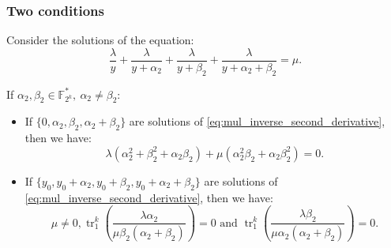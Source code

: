 \documentclass[
    aspectratio=169,                   %
]{beamer}
\newcommand{\Fks}{\mathbb{F}_{2^k}^*}
\newcommand{\tr}{\operatorname{tr}_1^k}
\begin{document}
    \begin{frame}
        \frametitle{Two conditions}
        Consider the solutions of the equation: 
        \begin{equation}\tag{5}
            \frac{\lambda}{y}+\frac{\lambda}{y+\alpha_2}+\frac{\lambda}{y+\beta_2}+\frac{\lambda}{y+\alpha_2+\beta_2}=\mu.
        \end{equation}

        If $ \alpha_2,\beta_2\in\Fks,~\alpha_2\ne\beta_2 $: 
        \begin{itemize}
            \item If $ \{0,\alpha_2,\beta_2,\alpha_2+\beta_2\} $ are solutions of \eqref{eq:mul_inverse_second_derivative}, 
            then we have: 
            \begin{equation}\label{condition:0_root_condition_1}\tag{c-1}
                \lambda(\alpha_2^2+\beta_2^2+\alpha_2\beta_2)+\mu(\alpha_2^2\beta_2+\alpha_2\beta_2^2)=0.
            \end{equation}
            \item If $ \{y_0,y_0+\alpha_2,y_0+\beta_2,y_0+\alpha_2+\beta_2\} $ 
            are solutions of \eqref{eq:mul_inverse_second_derivative}, then we have: 
            \begin{equation}\label{condition:y_0_root_condition_2}\tag{c-2}
                \mu\ne 0, \tr\left(\frac{\lambda\alpha_2}{\mu\beta_2(\alpha_2+\beta_2)}\right)=0\text{~and~} 
                \tr\left(\frac{\lambda\beta_2}{\mu\alpha_2(\alpha_2+\beta_2)}\right)=0.
            \end{equation}
        \end{itemize}
    
    \end{frame}
\end{document}
